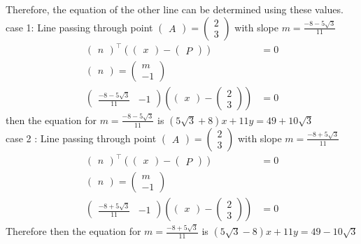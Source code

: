 \documentclass[10pt]{article}
\newcommand{\myvec}[1]{\ensuremath{\begin{pmatrix}#1\end{pmatrix}}}
\begin{document}
Therefore, the equation of the other line can be determined using these values.
\\
case 1: Line passing through point $\myvec{A} = \begin{pmatrix} 2 \\ 3 \end{pmatrix}$ with slope $m=\frac{-8 - 5\sqrt{3}}{11}$
\begin{align}
    \myvec{n}^\top({\myvec{x}-\myvec{P}})&= 0 \\
    \myvec{n} = \begin{pmatrix} m \\ -1 \end{pmatrix} \\
    \begin{pmatrix} \frac{-8 - 5\sqrt{3}}{11} & -1 \end{pmatrix}(\myvec{x}-\begin{pmatrix} 2 \\ 3 \end{pmatrix}) &= 0
\end{align}
then the equation for $m=\frac{-8 - 5\sqrt{3}}{11}$ is   $(5\sqrt{3}+8)x+11y=49+10\sqrt{3}$
\\
case 2 : Line passing through point $\myvec{A} = \begin{pmatrix} 2 \\ 3 \end{pmatrix}$ with slope $m =\frac{-8 + 5\sqrt{3}}{11}$
\begin{align}
    \myvec{n}^\top({\myvec{x}-\myvec{P}})&= 0 \\
    \myvec{n} = \begin{pmatrix} m \\ -1 \end{pmatrix} \\
    \begin{pmatrix} \frac{-8+5\sqrt{3}}{11} & -1 \end{pmatrix}(\myvec{x}-\begin{pmatrix} 2 \\ 3 \end{pmatrix}) &= 0
\end{align}
Therefore then  the equation for $m=\frac{-8 + 5\sqrt{3}}{11}$ is   $(5\sqrt{3}-8)x+11y=49-10\sqrt{3}$
\end{document}
